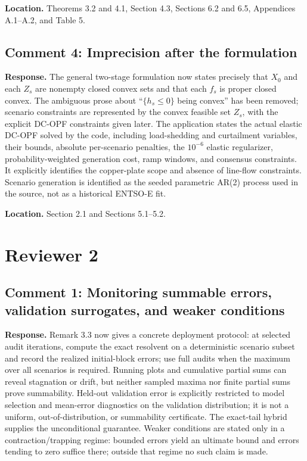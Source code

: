 \documentclass[11pt]{article}
\begin{document}
\textbf{Location.} Theorems 3.2 and 4.1, Section 4.3, Sections 6.2 and 6.5, Appendices A.1--A.2, and Table 5.

\subsection*{Comment 4: Imprecision after the formulation}
\textbf{Response.} The general two-stage formulation now states precisely that $X_0$ and each $Z_s$ are nonempty closed convex sets and that each $f_s$ is proper closed convex. The ambiguous prose about ``$\{h_s\le0\}$ being convex'' has been removed; scenario constraints are represented by the convex feasible set $Z_s$, with the explicit DC-OPF constraints given later. The application states the actual elastic DC-OPF solved by the code, including load-shedding and curtailment variables, their bounds, absolute per-scenario penalties, the $10^{-6}$ elastic regularizer, probability-weighted generation cost, ramp windows, and consensus constraints. It explicitly identifies the copper-plate scope and absence of line-flow constraints. Scenario generation is identified as the seeded parametric AR(2) process used in the source, not as a historical ENTSO-E fit.

\textbf{Location.} Section 2.1 and Sections 5.1--5.2.

\section*{Reviewer 2}
\subsection*{Comment 1: Monitoring summable errors, validation surrogates, and weaker conditions}
\textbf{Response.} Remark 3.3 now gives a concrete deployment protocol: at selected audit iterations, compute the exact resolvent on a deterministic scenario subset and record the realized initial-block errors; use full audits when the maximum over all scenarios is required. Running plots and cumulative partial sums can reveal stagnation or drift, but neither sampled maxima nor finite partial sums prove summability. Held-out validation error is explicitly restricted to model selection and mean-error diagnostics on the validation distribution; it is not a uniform, out-of-distribution, or summability certificate. The exact-tail hybrid supplies the unconditional guarantee. Weaker conditions are stated only in a contraction/trapping regime: bounded errors yield an ultimate bound and errors tending to zero suffice there; outside that regime no such claim is made.
\end{document}
